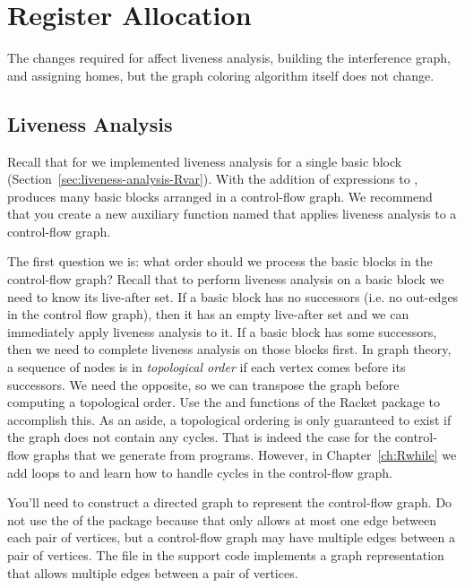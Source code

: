 \documentclass[11pt]{book}
\begin{document}
\section{Register Allocation}
\label{sec:register-allocation-Rif}

The changes required for \LangIf{} affect liveness analysis, building the
interference graph, and assigning homes, but the graph coloring
algorithm itself does not change.

\subsection{Liveness Analysis}
\label{sec:liveness-analysis-Rif}

Recall that for \LangVar{} we implemented liveness analysis for a single
basic block (Section~\ref{sec:liveness-analysis-Rvar}). With the
addition of  expressions to \LangIf{}, 
produces many basic blocks arranged in a control-flow graph.  We
recommend that you create a new auxiliary function named
 that applies liveness analysis to a
control-flow graph.

The first question we is: what order should we process the basic
blocks in the control-flow graph? Recall that to perform liveness
analysis on a basic block we need to know its live-after set. If a
basic block has no successors (i.e. no out-edges in the control flow
graph), then it has an empty live-after set and we can immediately
apply liveness analysis to it. If a basic block has some successors,
then we need to complete liveness analysis on those blocks first. In
graph theory, a sequence of nodes is in \emph{topological
  order} if each vertex comes before its
successors. We need the opposite, so we can transpose the graph
before computing a topological order.
%
Use the  and  functions of the Racket
 package to accomplish this.
%
As an aside, a topological ordering is only guaranteed to exist if the
graph does not contain any cycles. That is indeed the case for the
control-flow graphs that we generate from \LangIf{} programs.
However, in Chapter~\ref{ch:Rwhile} we add loops to \LangLoop{} and
learn how to handle cycles in the control-flow graph.

You'll need to construct a directed graph to represent the
control-flow graph. Do not use the  of the
 package because that only allows at most one edge between
each pair of vertices, but a control-flow graph may have multiple
edges between a pair of vertices. The  file in
the support code implements a graph representation that allows
multiple edges between a pair of vertices.
\end{document}

